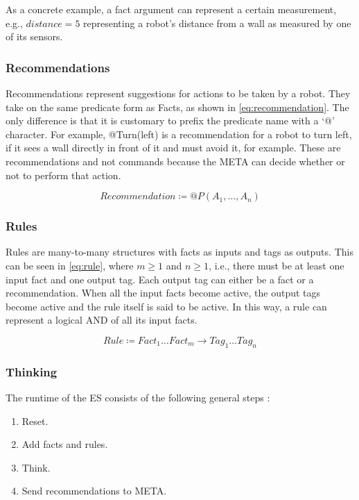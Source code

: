 \documentclass[titlepage,11pt]{article}
\begin{document}
As a concrete example, a fact argument can represent a certain measurement, e.g., $distance = 5$ representing a robot's distance from a wall as measured by one of its sensors.

\subsubsection{Recommendations}
Recommendations represent suggestions for actions to be taken by a robot. They take on the same predicate form as Facts, as shown in \cref{eq:recommendation}. The only difference is that it is customary to prefix the predicate name with a `@' character. For example, @Turn(left) is a recommendation for a robot to turn left, if it sees a wall directly in front of it and must avoid it, for example. These are recommendations and not commands because the META can decide whether or not to perform that action.

\begin{equation} \label{eq:recommendation}
	Recommendation \coloneqq @P(A_1, \ldots, A_n)
\end{equation}

\subsubsection{Rules}
Rules are many-to-many structures with facts as inputs and tags as outputs. This can be seen in \autoref{eq:rule}, where $m \geq 1$ and $n \geq 1$, i.e., there must be at least one input fact and one output tag. Each output tag can either be a fact or a recommendation. When all the input facts become active, the output tags become active and the rule itself is said to be active. In this way, a rule can represent a logical AND of all its input facts.

\begin{equation} \label{eq:rule}
	Rule \coloneqq Fact_1 \ldots Fact_m \rightarrow Tag_1 \ldots Tag_n
\end{equation}

\subsubsection{Thinking}
\label{sec:background_es_think}
The runtime of the ES consists of the following general steps \cite{vybihal-expert}:

\begin{enumerate}
	\item Reset.
	\item Add facts and rules.
	\item Think.
	\item Send recommendations to META.
\end{enumerate}
\end{document}
